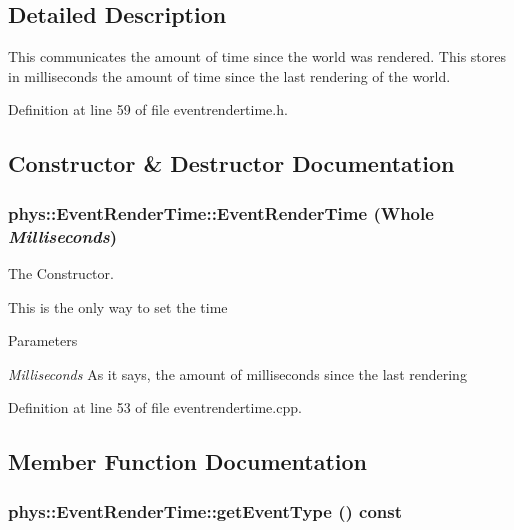 \subsection{Detailed Description}
This communicates the amount of time since the world was rendered. This stores in milliseconds the amount of time since the last rendering of the world. 

Definition at line 59 of file eventrendertime.h.



\subsection{Constructor \& Destructor Documentation}
\hypertarget{classphys_1_1EventRenderTime_af2384f7b09bbea42dcd2539a9e1747fd}{
\subsubsection[{EventRenderTime}]{\setlength{\rightskip}{0pt plus 5cm}phys::EventRenderTime::EventRenderTime ({\bf Whole} {\em Milliseconds})}}
\label{d3/d8b/classphys_1_1EventRenderTime_af2384f7b09bbea42dcd2539a9e1747fd}


The Constructor. 

This is the only way to set the time 
\begin{DoxyParams}{Parameters}
\item[{\em Milliseconds}]As it says, the amount of milliseconds since the last rendering \end{DoxyParams}


Definition at line 53 of file eventrendertime.cpp.



\subsection{Member Function Documentation}
\hypertarget{classphys_1_1EventRenderTime_a76a47983d5aa197104cc3c0b9dea9dfa}{
\subsubsection[{getEventType}]{ phys::EventRenderTime::getEventType () const}}
\label{d3/d8b/classphys_1_1EventRenderTime_a76a47983d5aa197104cc3c0b9dea9dfa}



